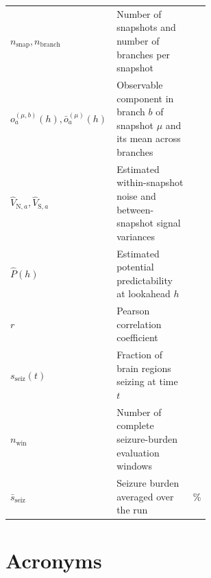 \begin{longtable}{@{}lp{0.58\linewidth}l@{}}
    $n_{\mathrm{snap}}, n_{\mathrm{branch}}$ & Number of snapshots and number of branches per snapshot & \textendash{} \\
    $o_a^{(\mu,b)}(h), \bar o_a^{(\mu)}(h)$ & Observable component in branch $b$ of snapshot $\mu$ and its mean across branches & \textendash{} \\
    $\widehat V_{\mathrm{N},a}, \widehat V_{\mathrm{S},a}$ & Estimated within-snapshot noise and between-snapshot signal variances & \textendash{} \\
    $\widehat P(h)$ & Estimated potential predictability at lookahead $h$ & \textendash{} \\
    $r$ & Pearson correlation coefficient & \textendash{} \\
    $s_{\mathrm{seiz}}(t)$ & Fraction of brain regions seizing at time $t$ & \textendash{} \\
    $n_{\mathrm{win}}$ & Number of complete seizure-burden evaluation windows & \textendash{} \\
    $\bar{s}_{\mathrm{seiz}}$ & Seizure burden averaged over the run & \si{\percent} \\
\end{longtable}

\clearpage
\section*{Acronyms}

\printacronyms[heading=none]
